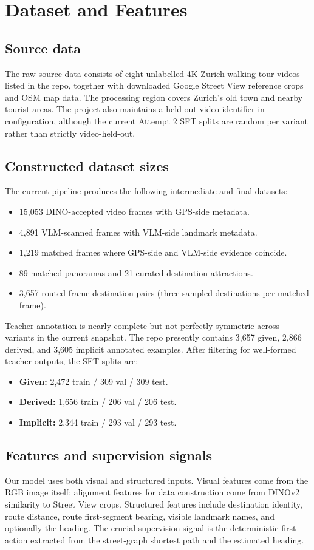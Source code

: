 \documentclass[10pt,twocolumn,letterpaper]{article}
\begin{document}
\section{Dataset and Features}
\subsection{Source data}
The raw source data consists of eight unlabelled 4K Zurich walking-tour videos listed in the repo, together with downloaded Google Street View reference crops and OSM map data. The processing region covers Zurich's old town and nearby tourist areas. The project also maintains a held-out video identifier in configuration, although the current Attempt 2 SFT splits are random per variant rather than strictly video-held-out.

\subsection{Constructed dataset sizes}
The current pipeline produces the following intermediate and final datasets:
\begin{itemize}
\item 15,053 DINO-accepted video frames with GPS-side metadata.
\item 4,891 VLM-scanned frames with VLM-side landmark metadata.
\item 1,219 matched frames where GPS-side and VLM-side evidence coincide.
\item 89 matched panoramas and 21 curated destination attractions.
\item 3,657 routed frame-destination pairs (three sampled destinations per matched frame).
\end{itemize}

Teacher annotation is nearly complete but not perfectly symmetric across variants in the current snapshot. The repo presently contains 3,657 given, 2,866 derived, and 3,605 implicit annotated examples. After filtering for well-formed teacher outputs, the SFT splits are:
\begin{itemize}
\item \textbf{Given:} 2,472 train / 309 val / 309 test.
\item \textbf{Derived:} 1,656 train / 206 val / 206 test.
\item \textbf{Implicit:} 2,344 train / 293 val / 293 test.
\end{itemize}

\subsection{Features and supervision signals}
Our model uses both visual and structured inputs. Visual features come from the RGB image itself; alignment features for data construction come from DINOv2 similarity to Street View crops. Structured features include destination identity, route distance, route first-segment bearing, visible landmark names, and optionally the heading. The crucial supervision signal is the deterministic first action extracted from the street-graph shortest path and the estimated heading.
\end{document}
